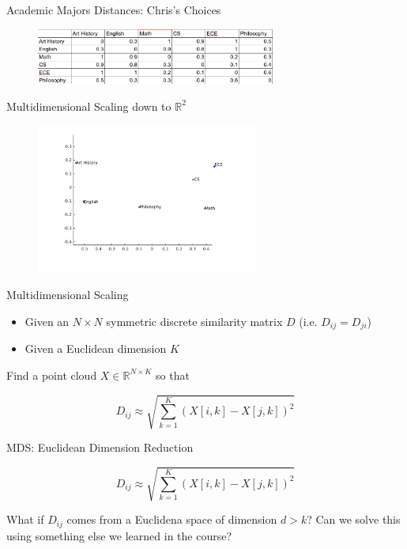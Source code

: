\documentclass{beamer}
\begin{document}
\begin{frame}{Academic Majors Distances: Chris's Choices}

\begin{figure}[t]
    \includegraphics[width=0.7\textwidth]{ChrisChoices.png}
\end{figure}
\small Multidimensional Scaling down to $\mathbb{R}^2$
\begin{figure}[t]
    \includegraphics[width=0.65\textwidth]{MDSClasses_Chris.pdf}
\end{figure}


\end{frame}

\begin{frame}{Multidimensional Scaling}

\begin{itemize}[label=$\vartriangleright$]
\item Given an $N \times N$ symmetric discrete similarity matrix $D$ (i.e. $D_{ij} = D_{ji}$)
\item Given a Euclidean dimension $K$
\end{itemize}

Find a point cloud $X \in \mathbb{R}^{N \times K}$ so that

\[ D_{ij} \approx \sqrt{\sum_{k = 1}^K (X[i, k] - X[j, k])^2} \]


\end{frame}

\begin{frame}{MDS: Euclidean Dimension Reduction}

\[ D_{ij} \approx \sqrt{\sum_{k = 1}^K (X[i, k] - X[j, k])^2} \]

What if $D_{ij}$ comes from a Euclidena space of dimension $d > k$?  Can we solve this using something else we learned in the course?


\end{frame}
\end{document}
